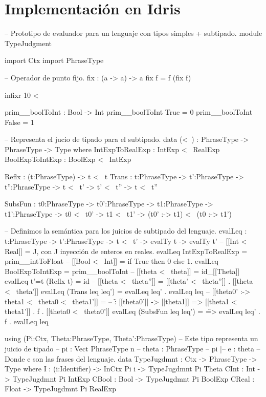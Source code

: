 \section{Implementaci\'on en Idris}

\begin{code}
-- Prototipo de evaluador para un lenguaje con tipos simples + subtipado.
module TypeJudgment

import Ctx
import PhraseType

-- Operador de punto fijo.
fix : (a -> a) -> a
fix f = f (fix f)

infixr 10 <~

prim__boolToInt : Bool -> Int
prim__boolToInt True = 0
prim__boolToInt False = 1

-- Representa el jucio de tipado para el subtipado.
data (<~) : PhraseType -> PhraseType -> Type where
    IntExpToRealExp : IntExp  <~ RealExp
    BoolExpToIntExp : BoolExp <~ IntExp
    
    Reflx : (t:PhraseType) -> t <~ t
    Trans : {t:PhraseType} -> {t':PhraseType} -> {t'':PhraseType} -> 
            t <~ t' -> t' <~ t'' -> t <~ t''
            
    SubsFun : {t0:PhraseType} -> {t0':PhraseType} -> 
              {t1:PhraseType} -> {t1':PhraseType} -> 
              t0 <~ t0' -> t1 <~ t1' -> (t0' :-> t1) <~ (t0 :-> t1')

-- Definimos la semántica para los juicios de subtipado del lenguaje.
evalLeq : {t:PhraseType} -> {t':PhraseType} -> t <~ t' -> evalTy t -> evalTy t'
-- [[Int <~ Real]] = J, con J inyección de enteros en reales.
evalLeq IntExpToRealExp    = prim__intToFloat
-- [[Bool <~ Int]] = if True then 0 else 1.
evalLeq BoolExpToIntExp    = prim__boolToInt
-- [[theta <~ theta]] = id_[[Theta]]
evalLeq {t'=t} (Reflx t)   = id
-- [[theta <~ theta'']] = [[theta' <~ theta'']] . [[theta <~ theta']]
evalLeq (Trans leq leq')   = evalLeq leq' . evalLeq leq
-- [[theta0' :-> theta1 <~ theta0 <~ theta1']] = 
-- \f : [[theta0']] -> [[theta1]] => [[theta1 <~ theta1']] . f . [[theta0 <~ theta0']]
evalLeq (SubsFun leq leq') = \f => evalLeq leq' . f . evalLeq leq

using (Pi:Ctx, Theta:PhraseType, Theta':PhraseType)
    -- Este tipo representa un juicio de tipado
    -- pi : Vect PhraseType n
    -- theta : PhraseType
    -- pi |-- e : theta
    -- Donde e son las frases del lenguaje.
    data TypeJugdmnt : Ctx -> PhraseType -> Type where
        I     : (i:Identifier) -> InCtx Pi i -> TypeJugdmnt Pi Theta
        CInt  : Int   -> TypeJugdmnt Pi IntExp
        CBool : Bool  -> TypeJugdmnt Pi BoolExp
        CReal : Float -> TypeJugdmnt Pi RealExp
        

\end{code}

